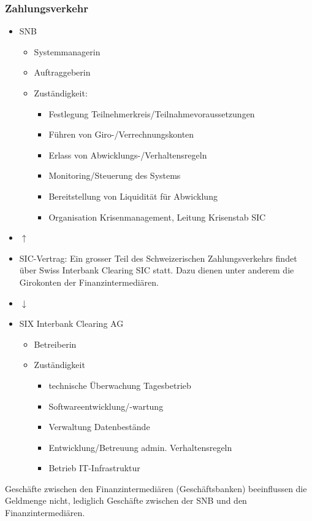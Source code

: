 \subsubsection{Zahlungsverkehr}
\begin{itemize}
	\item SNB
	\begin{itemize}
		\item Systemmanagerin
		\item Auftraggeberin
		\item Zuständigkeit:
		\begin{itemize}
			\item Festlegung Teilnehmerkreis/Teilnahmevoraussetzungen
			\item Führen von Giro-/Verrechnungskonten
			\item Erlass von Abwicklungs-/Verhaltensregeln
			\item Monitoring/Steuerung des Systems
			\item Bereitstellung von Liquidität für Abwicklung
			\item Organisation Krisenmanagement, Leitung Krisenstab SIC
		\end{itemize}
	\end{itemize}
	\item[\-] $\uparrow$
	\item SIC-Vertrag: Ein grosser Teil des Schweizerischen Zahlungsverkehrs findet über Swiss Interbank Clearing SIC statt. Dazu dienen unter anderem die Girokonten der Finanzintermediären.
	\item[\-] $\downarrow$
	\item SIX Interbank Clearing AG
	\begin{itemize}
		\item Betreiberin
		\item Zuständigkeit
		\begin{itemize}
			\item technische Überwachung Tagesbetrieb
			\item Softwareentwicklung/-wartung
			\item Verwaltung Datenbestände
			\item Entwicklung/Betreuung admin. Verhaltensregeln
			\item Betrieb IT-Infrastruktur
		\end{itemize}
	\end{itemize}
\end{itemize}
Geschäfte zwischen den Finanzintermediären (Geschäftsbanken) beeinflussen die Geldmenge nicht, lediglich Geschäfte zwischen der SNB und den Finanzintermediären.

